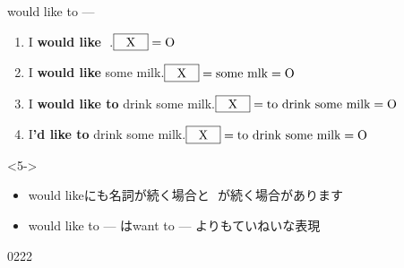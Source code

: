 \documentclass[aspectratio=169,xcolor={dvipsnames,table}]{beamer}
\begin{document}
\begin{frame}[plain]{would like to ---}
 \begin{enumerate}
  \item[0.]<1-> I \textbf{would like} \,\,.\hfill{\scriptsize $\fbox{\,\,\,\,X\,\,\,\,} = \text{O}$}
  \item<2-> I \textbf{would like} some milk.\hfill{\scriptsize $\fbox{\,\,\,\,X\,\,\,\,} = \text{some mlk} = \text{O}$}
  \item<3-> I \textbf{would like to} drink some milk.\hfill{\scriptsize $\fbox{\,\,\,\,X\,\,\,\,} = \text{to drink some milk} = \text{O}$}
  \item<4-> I\textbf{'d like to} drink some milk.\hfill{\scriptsize $\fbox{\,\,\,\,X\,\,\,\,} = \text{to drink some milk} = \text{O}$}
 \end{enumerate}

\vfill

\begin{block}<5->{}
\begin{itemize}[square]\small
 \item would likeにも名詞が続く場合と\,\,\,\,が続く場合があります
 \item would like to --- はwant to --- よりもていねいな表現
\end{itemize}
\end{block}
\hfill{\tiny 0222}\,{\scriptsize {}}

\end{frame}
\end{document}
